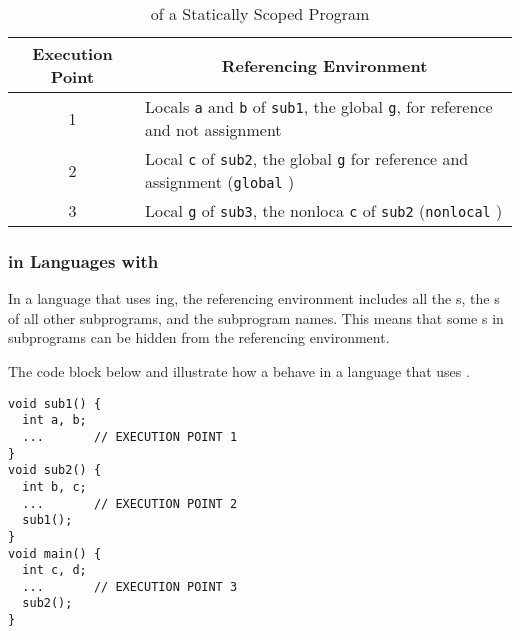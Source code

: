 \begin{table}[h!]
  \centering
  \begin{tabular}{cl}
    \toprule
    Execution Point & \multicolumn{1}{c}{Referencing Environment} \\
    \midrule
    1 & Locals \texttt{a} and \texttt{b} of \texttt{sub1}, the global \texttt{g}, for reference and not assignment \\
    2 & Local \texttt{c} of \texttt{sub2}, the global \texttt{g} for reference and assignment (\texttt{global} \nameref{def:Reserved_Word}) \\
    3 & Local \texttt{g} of \texttt{sub3}, the nonloca \texttt{c} of \texttt{sub2} (\texttt{nonlocal} \nameref{def:Reserved_Word}) \\
    \bottomrule
  \end{tabular}
  \caption{ of a Statically Scoped Program}
  \label{tab:Static_Scope_Referencing_Environment-Execution}
\end{table}

\subsubsection{ in Languages with }\label{subsubsec:Dynamic_Scope_Referencing_Environment}
In a language that uses ing, the referencing environment includes all the s, the s of all other  subprograms, and the subprogram names.
This means that some s in  subprograms can be hidden from the referencing environment.

The code block below and  illustrate how a  behave in a language that uses .

\begin{verbatim}
void sub1() {
  int a, b;
  ...       // EXECUTION POINT 1
}
void sub2() {
  int b, c;
  ...       // EXECUTION POINT 2
  sub1();
}
void main() {
  int c, d;
  ...       // EXECUTION POINT 3
  sub2();
}
\end{verbatim}

